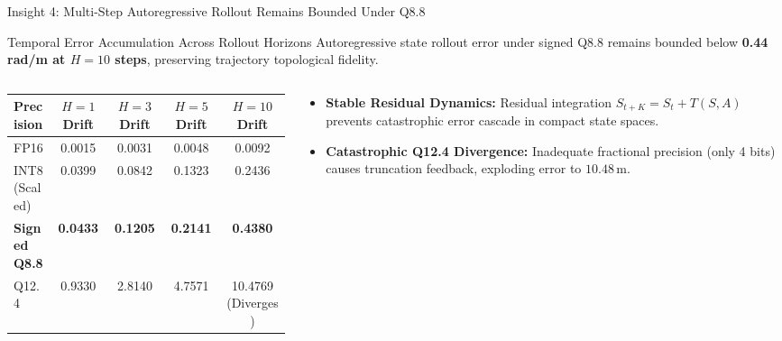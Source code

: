 \documentclass[aspectratio=169, 10pt]{beamer}
\begin{document}
\begin{frame}{Insight 4: Multi-Step Autoregressive Rollout Remains Bounded Under Q8.8}
  \begin{block}{Temporal Error Accumulation Across Rollout Horizons}
    Autoregressive state rollout error under signed Q8.8 remains bounded below \textbf{0.44 rad/m at $H=10$ steps}, preserving trajectory topological fidelity.
  \end{block}
  \vspace{-0.2cm}
  \begin{columns}[T]
    \begin{column}{0.52\textwidth}
      \setlength{\tabcolsep}{3pt}
      \begin{table}
        \centering
        \scriptsize
        \begin{tabular}{lcccc}
          \toprule
          \textbf{Precision} & \textbf{$H=1$ Drift} & \textbf{$H=3$ Drift} & \textbf{$H=5$ Drift} & \textbf{$H=10$ Drift} \\
          \midrule
          FP16 & 0.0015 & 0.0031 & 0.0048 & 0.0092 \\
          INT8 (Scaled) & 0.0399 & 0.0842 & 0.1323 & 0.2436 \\
          \textbf{Signed Q8.8} & \textbf{0.0433} & \textbf{0.1205} & \textbf{0.2141} & \textbf{0.4380} \\
          Q12.4 & 0.9330 & 2.8140 & 4.7571 & 10.4769 (Diverges) \\
          \bottomrule
        \end{tabular}
      \end{table}
    \end{column}
    \begin{column}{0.46\textwidth}
      \begin{itemize}
        \item \textbf{Stable Residual Dynamics:} Residual integration $S_{t+K} = S_t + T(S, A)$ prevents catastrophic error cascade in compact state spaces.
        \item \textbf{Catastrophic Q12.4 Divergence:} Inadequate fractional precision (only 4 bits) causes truncation feedback, exploding error to $10.48\,\text{m}$.
      \end{itemize}
    \end{column}
  \end{columns}
\end{frame}
\end{document}

